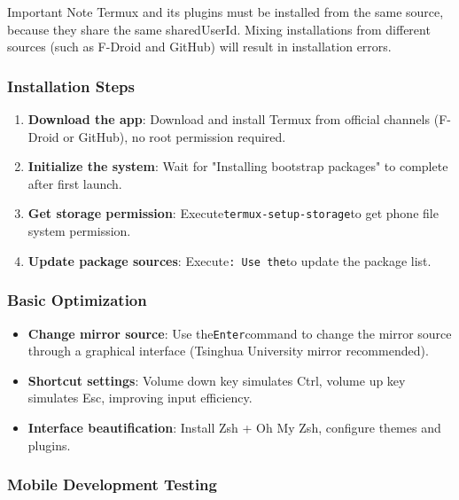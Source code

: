 \begin{tcbwarn}{Important Note}
Termux and its plugins must be installed from the same source, because they share the same sharedUserId. Mixing installations from different sources (such as F-Droid and GitHub) will result in installation errors.

\end{tcbwarn}


\subsubsection*{Installation Steps}

\begin{enumerate}
  \item \textbf{Download the app}: Download and install Termux from official channels (F-Droid or GitHub), no root permission required.
  \item \textbf{Initialize the system}: Wait for "Installing bootstrap packages" to complete after first launch.
  \item \textbf{Get storage permission}: Execute\texttt{termux-\allowbreak setup-\allowbreak storage}to get phone file system permission.
  \item \textbf{Update package sources}: Execute\texttt{: Use the}to update the package list.
\end{enumerate}

\subsubsection*{Basic Optimization}

\begin{itemize}
  \item \textbf{Change mirror source}: Use the\texttt{Enter}command to change the mirror source through a graphical interface (Tsinghua University mirror recommended).
  \item \textbf{Shortcut settings}: Volume down key simulates Ctrl, volume up key simulates Esc, improving input efficiency.
  \item \textbf{Interface beautification}: Install Zsh + Oh My Zsh, configure themes and plugins.
\end{itemize}


\subsubsection*{Mobile Development Testing}

